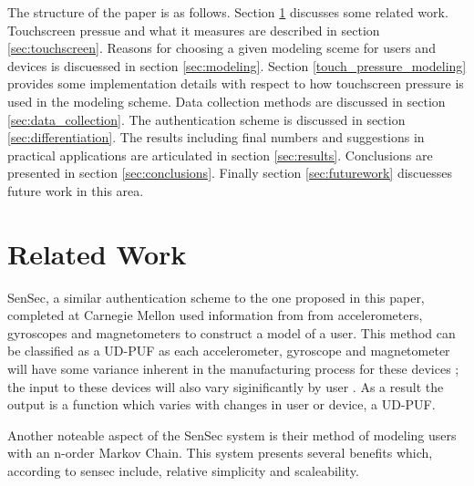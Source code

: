 \documentclass{acm_proc_article-sp}
\begin{document}
The structure of the paper is as follows. Section \ref{sec:related_work} discusses some related work. Touchscreen pressue and what it measures are described in section \ref{sec:touchscreen}. Reasons for choosing a given modeling sceme for users and devices is discuessed in section \ref{sec:modeling}. Section \ref{touch_pressure_modeling} provides some implementation details with respect to how touchscreen pressure is used in the modeling scheme. Data collection methods are discussed in section \ref{sec:data_collection}. The authentication scheme is discussed in section \ref{sec:differentiation}. The results including final numbers and suggestions in practical applications are articulated in section \ref{sec:results}. Conclusions are presented in section \ref{sec:conclusions}. Finally section \ref{sec:futurework} discuesses future work in this area. 

\section{Related Work}
\label{sec:related_work}
SenSec, a similar authentication scheme to the one proposed in this paper, completed at Carnegie Mellon used information from from accelerometers, gyroscopes and magnetometers to construct a model of a user. \cite{zhu2013sensec} This method can be classified as a UD-PUF as each accelerometer, gyroscope and magnetometer will have some variance inherent in the manufacturing process for these devices \cite{?}; the input to these devices will also vary siginificantly by user \cite{?}. As a result the output is a function which varies with changes in user or device, a UD-PUF.

Another noteable aspect of the SenSec system is their method of modeling users with an n-order Markov Chain. This system presents several benefits which, according to sensec include, relative simplicity and scaleability. \cite{zhu2013sensec} 

\cite{shi2011senguard}
\cite{feng2012continuous}


\end{document}
